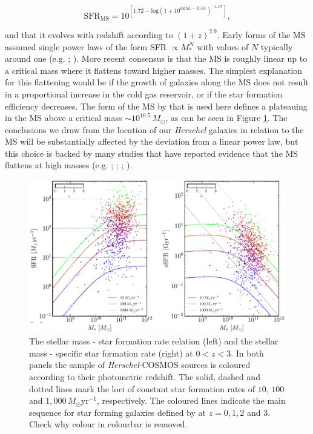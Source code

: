 \begin{equation}
	\textrm{SFR}_{\textrm{MS}} = 10^{[1.72-\textrm{log}(1+10^{\textrm{log}M_*-10.31})^{-1.07}]},
	\label{eq:scoville_ms}
\end{equation}

\noindent and that it evolves with redshift according to $(1+z)^{2.9}$. Early forms of the MS assumed single power laws of the form SFR $\propto M_*^N$ with values of $N$ typically around one (e.g. \citealt{Daddi_2007}; \citealt{Elbaz_2007}). More recent consensus is that the MS is roughly linear up to a critical mass where it flattens toward higher masses. The simplest explanation for this flattening would be if the growth of galaxies along the MS does not result in a proportional increase in the cold gas reservoir, or if the star formation efficiency decreases. The form of the MS by \citealt{Scoville_2017} that is used here defines a plateauing in the MS above a critical mass $\sim 10^{10.5}\,M_\odot$, as can be seen in Figure \ref{fig:star_formation_ms}. The conclusions we draw from the location of our \textit{Herschel} galaxies in relation to the MS will be substantially affected by the deviation from a linear power law, but this choice is backed by many studies that have reported evidence that the MS flattens at high masses (e.g. \citealt{Magnelli_2014}; \citealt{Whitaker_2014}; \citealt{Schreiber_2015}; \citealt{Tomczak_2016}).

\begin{figure}
	\centering
	\includegraphics[width=0.9\columnwidth]{Figures/star_formation_ms.pdf}
	\caption{The stellar mass - star formation rate relation (left) and the stellar mass - specific star formation rate (right) at $0 < z < 3$. In both panels the sample of \textit{Herschel}-COSMOS sources is coloured according to their photometric redshift. The solid, dashed and dotted lines mark the loci of constant star formation rates of $10$, $100$ and $1,000\,M_\odot$yr$^{-1}$, respectively. The coloured lines indicate the main sequence for star forming galaxies defined by \citealt{Scoville_2017} at $z = 0, 1, 2$ and $3$. {\color{red}Check why colour in colourbar is removed.}}
	\label{fig:star_formation_ms}
\end{figure}

